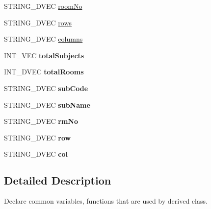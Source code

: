 \begin{DoxyCompactItemize}
\item 
S\-T\-R\-I\-N\-G\-\_\-D\-V\-E\-C \hyperlink{classInputDetail_a3193354764ba0b44b2eb4b366b4c273a}{room\-No}
\item 
S\-T\-R\-I\-N\-G\-\_\-D\-V\-E\-C \hyperlink{classInputDetail_aa203edbcfd4083624dbc4dc055c1e6e5}{rows}
\item 
S\-T\-R\-I\-N\-G\-\_\-D\-V\-E\-C \hyperlink{classInputDetail_a8563f1b6c4d2e74a9b8421a12585395c}{columns}
\item 
\hypertarget{classInputDetail_a09dcf8264ffc09609448e32b0f27bd9a}{I\-N\-T\-\_\-\-V\-E\-C {\bfseries total\-Subjects}}\label{classInputDetail_a09dcf8264ffc09609448e32b0f27bd9a}

\item 
\hypertarget{classInputDetail_ae47ff085393d9555ae7c080759a7dae7}{I\-N\-T\-\_\-D\-V\-E\-C {\bfseries total\-Rooms}}\label{classInputDetail_ae47ff085393d9555ae7c080759a7dae7}

\item 
\hypertarget{classInputDetail_a375eb1fe30c29f80a2020dd63c173428}{S\-T\-R\-I\-N\-G\-\_\-D\-V\-E\-C {\bfseries sub\-Code}}\label{classInputDetail_a375eb1fe30c29f80a2020dd63c173428}

\item 
\hypertarget{classInputDetail_ad5279168818a6af3578a0f70e4be195d}{S\-T\-R\-I\-N\-G\-\_\-D\-V\-E\-C {\bfseries sub\-Name}}\label{classInputDetail_ad5279168818a6af3578a0f70e4be195d}

\item 
\hypertarget{classInputDetail_a01a2dbec27704527002029a9ed8bb35f}{S\-T\-R\-I\-N\-G\-\_\-D\-V\-E\-C {\bfseries rm\-No}}\label{classInputDetail_a01a2dbec27704527002029a9ed8bb35f}

\item 
\hypertarget{classInputDetail_a2ecfc489098c98cf26d22ca422572a0f}{S\-T\-R\-I\-N\-G\-\_\-D\-V\-E\-C {\bfseries row}}\label{classInputDetail_a2ecfc489098c98cf26d22ca422572a0f}

\item 
\hypertarget{classInputDetail_a7d61822dbecef7d625efc05d7ab6bd30}{S\-T\-R\-I\-N\-G\-\_\-D\-V\-E\-C {\bfseries col}}\label{classInputDetail_a7d61822dbecef7d625efc05d7ab6bd30}

\end{DoxyCompactItemize}


\subsection{Detailed Description}
Declare common variables, functions that are used by derived class. 

